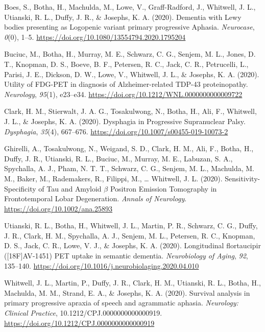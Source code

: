 \documentclass[11pt, a4paper]{awesome-cv}
\begin{document}
\leavevmode\hypertarget{ref-boes_dementia_2020}{}%
Boes, S., Botha, H., Machulda, M., Lowe, V., Graff-Radford, J.,
Whitwell, J. L., Utianski, R. L., Duffy, J. R., \& Josephs, K. A.
(2020). Dementia with {Lewy} bodies presenting as {Logopenic} variant
primary progressive {Aphasia}. \emph{Neurocase}, \emph{0}(0), 1--5.
\url{https://doi.org/10.1080/13554794.2020.1795204}

\leavevmode\hypertarget{ref-buciuc_utility_2020}{}%
Buciuc, M., Botha, H., Murray, M. E., Schwarz, C. G., Senjem, M. L.,
Jones, D. T., Knopman, D. S., Boeve, B. F., Petersen, R. C., Jack, C.
R., Petrucelli, L., Parisi, J. E., Dickson, D. W., Lowe, V., Whitwell,
J. L., \& Josephs, K. A. (2020). Utility of {FDG}-{PET} in diagnosis of
{Alzheimer}-related {TDP}-43 proteinopathy. \emph{Neurology},
\emph{95}(1), e23--e34.
\url{https://doi.org/10.1212/WNL.0000000000009722}

\leavevmode\hypertarget{ref-clark_dysphagia_2020}{}%
Clark, H. M., Stierwalt, J. A. G., Tosakulwong, N., Botha, H., Ali, F.,
Whitwell, J. L., \& Josephs, K. A. (2020). Dysphagia in {Progressive}
{Supranuclear} {Palsy}. \emph{Dysphagia}, \emph{35}(4), 667--676.
\url{https://doi.org/10.1007/s00455-019-10073-2}

\leavevmode\hypertarget{ref-ghirelli_sensitivity-specificity_2020}{}%
Ghirelli, A., Tosakulwong, N., Weigand, S. D., Clark, H. M., Ali, F.,
Botha, H., Duffy, J. R., Utianski, R. L., Buciuc, M., Murray, M. E.,
Labuzan, S. A., Spychalla, A. J., Pham, N. T. T., Schwarz, C. G.,
Senjem, M. L., Machulda, M. M., Baker, M., Rademakers, R., Filippi, M.,
\ldots{} Whitwell, J. L. (2020). Sensitivity-{Specificity} of {Tau} and
{Amyloid} \(\beta\) {Positron} {Emission} {Tomography} in
{Frontotemporal} {Lobar} {Degeneration}. \emph{Annals of Neurology}.
\url{https://doi.org/10.1002/ana.25893}

\leavevmode\hypertarget{ref-utianski_longitudinal_2020-1}{}%
Utianski, R. L., Botha, H., Whitwell, J. L., Martin, P. R., Schwarz, C.
G., Duffy, J. R., Clark, H. M., Spychalla, A. J., Senjem, M. L.,
Petersen, R. C., Knopman, D. S., Jack, C. R., Lowe, V. J., \& Josephs,
K. A. (2020). Longitudinal flortaucipir ({[}{18F}{]}{AV}-1451) {PET}
uptake in semantic dementia. \emph{Neurobiology of Aging}, \emph{92},
135--140. \url{https://doi.org/10.1016/j.neurobiolaging.2020.04.010}

\leavevmode\hypertarget{ref-whitwell_survival_2020}{}%
Whitwell, J. L., Martin, P., Duffy, J. R., Clark, H. M., Utianski, R.
L., Botha, H., Machulda, M. M., Strand, E. A., \& Josephs, K. A. (2020).
Survival analysis in primary progressive apraxia of speech and
agrammatic aphasia. \emph{Neurology: Clinical Practice},
10.1212/CPJ.0000000000000919.
\url{https://doi.org/10.1212/CPJ.0000000000000919}
\end{document}
